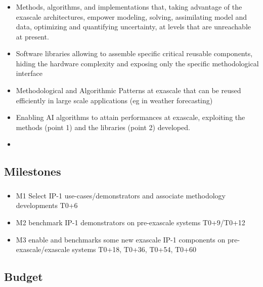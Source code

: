 \begin{frame}
  \frametitle{\insertsectionhead}
  \framesubtitle{\insertsubsectionhead}
  \begin{itemize}
      \item   Methods, algorithms, and implementations that, taking advantage of the exascale architectures, empower modeling, solving, assimilating model and data, optimizing and quantifying uncertainty, at levels that are unreachable at present.
    \item Software libraries allowing to assemble specific critical reusable components, hiding the hardware complexity and exposing only the specific methodological interface
    \item Methodological and Algorithmic Patterns at exascale that can be reused efficiently in large scale applications (eg in weather forecasting)
    \item Enabling AI algorithms to attain performances at exascale, exploiting the methods (point 1) and the libraries (point 2) developed.
    \item \href{https://docs.google.com/document/d/1hjwSFRF63SyTUJJKGMNLHcJPr_S2JDHYXeBeQzHCSno/edit?usp=sharing}{}

  \end{itemize}


\end{frame}

\subsection{Milestones}

\begin{frame}
  \frametitle{\insertsectionhead}
  \framesubtitle{\insertsubsectionhead}
  \begin{itemize}
      \item   M1 Select IP-1 use-cases/demonstrators and associate methodology developments T0+6
\item M2 benchmark IP-1 demonstrators on pre-exascale systems T0+9/T0+12
\item M3 enable and benchmarks some new exascale  IP-1 components on pre-exascale/exascale systems T0+18, T0+36, T0+54, T0+60
  \end{itemize}


\end{frame}

\subsection{Budget}

